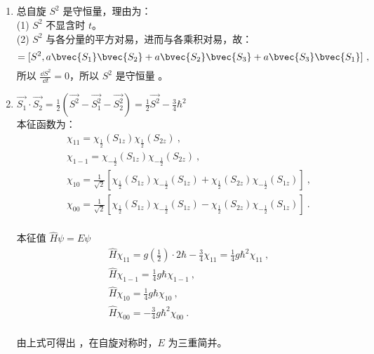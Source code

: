 \subsection{ }
\begin{enumerate}
\item 总自旋 $S^2$ 是守恒量，理由为：\\
(1) $S^2$ 不显含时 $t$。\\
(2) $S^2$ 与各分量的平方对易，进而与各乘积对易，故：\\
\begin{equation}
[S^2 ,H^2] = [S^2 , a \bvec{S_1} \bvec{S_2} + a \bvec{S_2} \bvec{S_3} + a \bvec{S_3} \bvec{S_1}]~,
\end{equation}
所以 $\frac{\dd{S^2}}{\dd{t}}=0$，所以 $S^2$ 是守恒量 。

\item $\displaystyle \vec{S_1} \cdot \vec{S_2} = \frac{1}{2} (\vec{S^2} -\vec{S^2_1} -\vec{S^2_2}) = \frac{1}{2} \vec{S^2} - \frac{3}{4} \hbar^2 $ \\

本征函数为：\\
\begin{equation}
\begin{aligned}
& \chi_{11} = \chi_{\frac{1}{2}}(S_{1z})\chi_{\frac{1}{2}}(S_{2z})~, \\
& \chi_{1-1} = \chi_{-\frac{1}{2}}(S_{1z})\chi_{-\frac{1}{2}}(S_{2z}) ~,\\
& \chi_{10} = \frac{1}{\sqrt{2}} \left[ \chi_{\frac{1}{2}}(S_{1z})\chi_{-\frac{1}{2}}(S_{1z}) + \chi_{\frac{1}{2}}(S_{2z})\chi_{-\frac{1}{2}}(S_{1z}) \right]~, \\
& \chi_{00} = \frac{1}{\sqrt{2}} \left[ \chi_{\frac{1}{2}}(S_{1z})\chi_{-\frac{1}{2}}(S_{1z}) - \chi_{\frac{1}{2}}(S_{2z})\chi_{-\frac{1}{2}}(S_{1z}) \right] ~. \\
\end{aligned}
\end{equation}

本征值 $\hat{H}\psi = E\psi $ \\
\begin{equation}
\begin{aligned}
& \hat{H}\chi_{11} = g(\frac{1}{2}) \cdot 2\hbar - \frac{3}{4} \chi_{11} = \frac{1}{4}g\hbar^{2} \chi_{11}~,  \\
& \hat{H}\chi_{1-1} = \frac{1}{4}g\hbar \chi_{1-1} ~, \\
& \hat{H}\chi_{10} = \frac{1}{4}g\hbar \chi_{10} ~, \\
& \hat{H}\chi_{00} = -\frac{3}{4}g\hbar^{2} \chi_{00}  ~.\\
\end{aligned}
\end{equation}

由上式可得出 ，在自旋对称时，$E$ 为三重简并。
\end{enumerate}